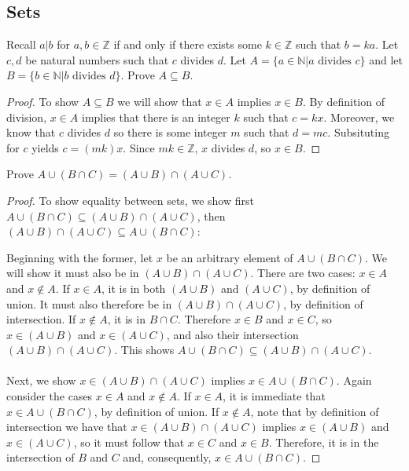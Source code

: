 \documentclass[]{exam}
\theoremstyle{definition}
\newcommand{\bb}[1]{\mathbb{#1}}
\newcommand{\Z}{\bb{Z}}
\newcommand{\N}{\bb{N}}
\begin{document}
\begin{questions}
\subsection*{Sets}
Recall $a|b$ for $a,b \in \Z$ if and only if there exists some $k \in \Z$ such that $b = ka$.
\question Let $c, d$ be natural numbers such that $c$ divides $d$.
   Let $A = \{a \in \N| a \text{ divides } c \}$ and let\\ 
   $B = \{b \in \N| b\text{ divides }d \}$. Prove $A \subseteq B$.

\begin{solution}
\begin{proof}
To show $A \subseteq B$ we will show that $x \in A$ implies $x \in B$.
By definition of division, $x \in A$ implies that there is an integer
$k$ such that $c = kx$. Moreover, we know that $c$ divides $d$ so
there is some integer $m$ such that $d = mc$. Subsituting for
$c$ yields $c = (mk)x$. Since $mk \in \Z$, $x$ divides $d$, so $x \in B$.
\end{proof}
\end{solution}


\question
Prove $A \cup (B \cap C) = (A \cup B) \cap (A \cup C)$.
\begin{solution}
\begin{proof}
To show equality between sets, we show first $A \cup (B \cap C) \subseteq (A
    \cup B) \cap (A \cup C)$, then 
$(A \cup B) \cap (A \cup C) \subseteq A \cup (B \cap C)$:

Beginning with the former, let $x$ be an arbitrary element of 
$A \cup (B \cap C)$. We will show it must also be in $(A \cup B) \cap (A \cup C)$. 
There are two cases: $x \in A$ and $x \notin A$. If $x \in A$, it is in both
 $(A \cup B)$ and $(A \cup C)$, by definition of union. It must also therefore
 be in $(A \cup B) \cap (A \cup C)$, by definition of intersection. If $x \notin A$, 
 it is in $B \cap C$. Therefore $x \in B$ and $x \in C$, so $x \in (A \cup B)$ and 
 $x \in (A \cup C)$, and also their intersection $(A \cup B) \cap (A \cup C)$.
This shows $A \cup (B \cap C) \subseteq (A \cup B) \cap (A \cup C)$.
\\~\\
Next, we show $x \in (A \cup B) \cap (A \cup C)$ implies 
$x \in A \cup (B \cap C)$. Again consider the cases $x \in A$ and $x \notin A$.
If $x \in A$, it is immediate that $x \in A \cup (B \cap C)$, by definition
of union. If $x \notin A$, note that by definition of intersection we have that
$x \in (A \cup B) \cap (A \cup C)$ implies $x \in (A \cup B)$ and $x \in (A \cup C)$,
so it must follow that $x \in C$ and $x \in B$. Therefore, it is in the
intersection of $B$ and $C$ and, consequently, $x \in A \cup (B \cap C)$.


\end{proof}
\end{solution}
\end{questions}
\end{document}
